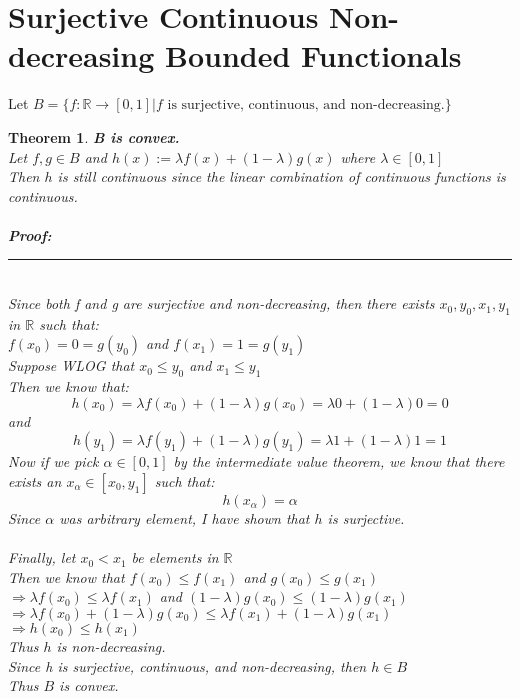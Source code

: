 \documentclass[12pt]{extarticle}
\theoremstyle{plain}
\newtheorem{thm}{Theorem}[section]
\theoremstyle{plain}
\theoremstyle{plain}
\theoremstyle{Definition}
\theoremstyle{Definition}
\theoremstyle{plain}
\newcommand{\cut}[0]{\noindent\framebox[\linewidth]{\rule{\linewidth}{2pt}}\\}
\newcommand{\prof}[0]{	\noindent \textbf{Proof:} \rule{500pt}{2pt} \\ }
\begin{document}
\section{Surjective Continuous Non-decreasing Bounded Functionals}
	Let $B = \{f : \mathbb{R} \to [0,1] | f \text{ is surjective, continuous, and non-decreasing.}\}$ \\ 
	\begin{thm} \textbf{B is convex. } \\
			Let $f,g \in B$ and $h(x) := \lambda f(x) + (1-\lambda)g(x)$ where $\lambda \in [0,1]$ \\ 
			Then $h$ is still continuous since the linear combination of continuous functions is continuous.  \\ \\
			\prof
			Since both f and g are surjective and non-decreasing, then there exists $x_0,y_0,x_1,y_1$ in $\mathbb{R}$ such that: \\ 
			$f(x_0) = 0 = g(y_0)$ and $f(x_1) = 1 = g(y_1)$ \\ 
			Suppose WLOG that $x_0 \leq y_0$ and $x_1 \leq y_1$ \\
			Then we know that: 
			$$h(x_0) = \lambda f(x_0) + (1-\lambda)g(x_0) = \lambda 0 + (1-\lambda)0 = 0$$
			and 
			$$h(y_1) = \lambda f(y_1) + (1-\lambda)g(y_1) = \lambda 1 + (1-\lambda)1 = 1$$
			Now if we pick $\alpha \in [0,1]$ by the intermediate value theorem, we know that there exists an $x_\alpha \in [x_0,y_1]$ such that: 
			$$h(x_\alpha) = \alpha$$
			Since $\alpha$ was arbitrary element, I have shown that $h$ is surjective. \\ \\
			Finally, let $x_0 < x_1$ be elements in $\mathbb{R}$ \\ 
			Then we know that $f(x_0) \leq f(x_1)$ and $g(x_0) \leq g(x_1)$ \\ 
			$\Rightarrow \lambda f(x_0) \leq \lambda f(x_1)$ and $(1-\lambda)g(x_0) \leq (1-\lambda)g(x_1)$ \\ 
			$\Rightarrow \lambda f(x_0) + (1-\lambda)g(x_0) \leq \lambda f(x_1) + (1-\lambda)g(x_1)$ \\ 
			$\Rightarrow h(x_0) \leq h(x_1)$ \\ 
			Thus $h$ is non-decreasing. \\ 
			Since h is surjective, continuous, and non-decreasing, then $h \in B$ \\ 
			Thus $B$ is convex. 
	\end{thm}
	\cut
\end{document}
